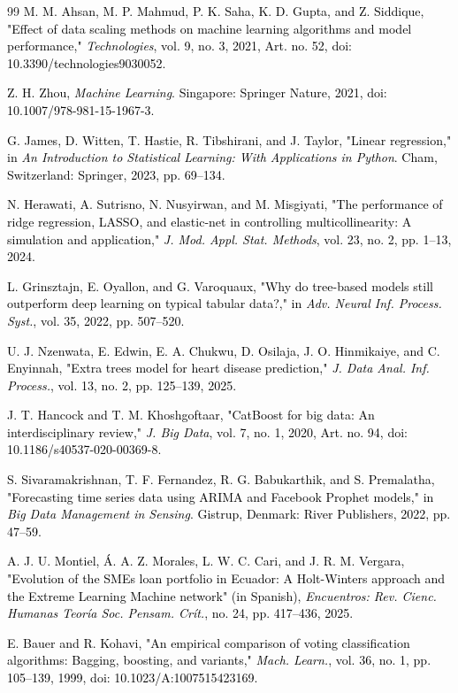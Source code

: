 \documentclass[final, 9pt, twocolumn]{saucis}
\newcommand{\rev}[1]{\textcolor{black}{#1}}
\begin{document}
\begin{thebibliography}{99}
 \rev{M. M. Ahsan, M. P. Mahmud, P. K. Saha, K. D. Gupta, and Z. Siddique, "Effect of data scaling methods on machine learning algorithms and model performance," \emph{Technologies}, vol. 9, no. 3, 2021, Art. no. 52, doi: 10.3390/technologies9030052.}

 \rev{Z. H. Zhou, \emph{Machine Learning}. Singapore: Springer Nature, 2021, doi: 10.1007/978-981-15-1967-3.}

 \rev{G. James, D. Witten, T. Hastie, R. Tibshirani, and J. Taylor, "Linear regression," in \emph{An Introduction to Statistical Learning: With Applications in Python}. Cham, Switzerland: Springer, 2023, pp. 69--134.}

 \rev{N. Herawati, A. Sutrisno, N. Nusyirwan, and M. Misgiyati, "The performance of ridge regression, LASSO, and elastic-net in controlling multicollinearity: A simulation and application," \emph{J. Mod. Appl. Stat. Methods}, vol. 23, no. 2, pp. 1--13, 2024.}

 \rev{L. Grinsztajn, E. Oyallon, and G. Varoquaux, "Why do tree-based models still outperform deep learning on typical tabular data?," in \emph{Adv. Neural Inf. Process. Syst.}, vol. 35, 2022, pp. 507--520.}

 \rev{U. J. Nzenwata, E. Edwin, E. A. Chukwu, D. Osilaja, J. O. Hinmikaiye, and C. Enyinnah, "Extra trees model for heart disease prediction," \emph{J. Data Anal. Inf. Process.}, vol. 13, no. 2, pp. 125--139, 2025.}

 \rev{J. T. Hancock and T. M. Khoshgoftaar, "CatBoost for big data: An interdisciplinary review," \emph{J. Big Data}, vol. 7, no. 1, 2020, Art. no. 94, doi: 10.1186/s40537-020-00369-8.}

 \rev{S. Sivaramakrishnan, T. F. Fernandez, R. G. Babukarthik, and S. Premalatha, "Forecasting time series data using ARIMA and Facebook Prophet models," in \emph{Big Data Management in Sensing}. Gistrup, Denmark: River Publishers, 2022, pp. 47--59.}

 \rev{A. J. U. Montiel, Á. A. Z. Morales, L. W. C. Cari, and J. R. M. Vergara, "Evolution of the SMEs loan portfolio in Ecuador: A Holt-Winters approach and the Extreme Learning Machine network" (in Spanish), \emph{Encuentros: Rev. Cienc. Humanas Teoría Soc. Pensam. Crít.}, no. 24, pp. 417--436, 2025.}

 \rev{E. Bauer and R. Kohavi, "An empirical comparison of voting classification algorithms: Bagging, boosting, and variants," \emph{Mach. Learn.}, vol. 36, no. 1, pp. 105--139, 1999, doi: 10.1023/A:1007515423169.}


\end{thebibliography}
\end{document}
